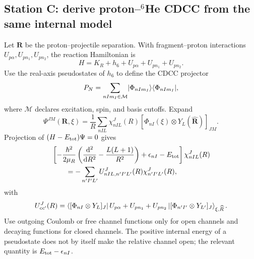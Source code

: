 \subsection{Station C: derive proton--\texorpdfstring{$^6$He}{6He} CDCC from
the same internal model}
\label{subsec:he6-proton-cdcc}

Let $\bm R$ be the proton--projectile separation.  With fragment--proton
interactions $U_{p\alpha},U_{pn_1},U_{pn_2}$, the reaction Hamiltonian is
\begin{equation}
  H=K_R+h_6+U_{p\alpha}+U_{pn_1}+U_{pn_2}.
  \label{eq:he6-proton-reaction-H}
\end{equation}
Use the real-axis pseudostates of $h_6$ to define the CDCC projector
\begin{equation}
  P_N=\sum_{nI m_I\in\mathcal M}
  \ket{\Phi_{nIm_I}}\bra{\Phi_{nIm_I}},
  \label{eq:he6-cdcc-projector}
\end{equation}
where $\mathcal M$ declares excitation, spin, and basis cutoffs.  Expand
\begin{equation}
  \Psi^{JM}(\bm R,\xi)
  =\frac{1}{R}\sum_{nIL}
  \chi_{nIL}^J(R)
  [\Phi_{nI}(\xi)\otimes Y_L(\widehat{\bm R})]_{JM}.
  \label{eq:he6-cdcc-expansion}
\end{equation}
Projection of $(H-\vsub{E}{tot})\Psi=0$ gives
\begin{align}
  &\left[-\frac{\hbar^2}{2\mu_R}
  \left(\frac{\rmd^2}{\rmd R^2}-\frac{L(L+1)}{R^2}\right)
  +\epsilon_{nI}-\vsub{E}{tot}\right]
  \chi_{nIL}^J(R)
  \notag\\
  &\qquad=-\sum_{n'I'L'}
  U_{nIL,n'I'L'}^J(R)\chi_{n'I'L'}^J(R),
  \label{eq:he6-cdcc-coupled-equations}
\end{align}
with
\begin{equation}
  U_{cc'}^J(R)
  =\Bra{[\Phi_{nI}\otimes Y_L]_J}
  U_{p\alpha}+U_{pn_1}+U_{pn_2}
  \Ket{[\Phi_{n'I'}\otimes Y_{L'}]_J}_{\xi,\widehat R}.
  \label{eq:he6-cdcc-couplings}
\end{equation}
Use outgoing Coulomb or free channel functions only for open channels and
decaying functions for closed channels.  The positive internal energy of a
pseudostate does not by itself make the relative channel open; the relevant
quantity is $\vsub{E}{tot}-\epsilon_{nI}$.


